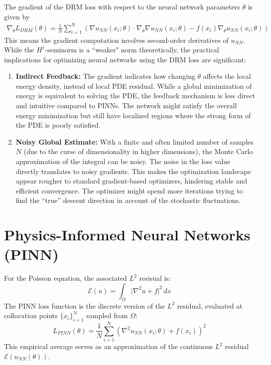 \documentclass{article}
\begin{document}
The gradient of the DRM loss with respect to the neural network parameters $\theta$ is given by
\begin{align*}
    \nabla_{\theta} L_{DRM}(\theta)
    = \frac{1}{N} \sum_{i=1}^N \left(\nabla u_{NN}(x_i; \theta) \cdot \nabla_{\theta} \nabla u_{NN}(x_i; \theta) - f(x_i) \nabla_{\theta} u_{NN}(x_i; \theta)\right)
\end{align*}
This means the gradient computation involves second-order derivatives of $u_{NN}$. 
While the $H^1$-seminorm is a ``weaker" norm theoretically, the practical implications for optimizing neural networks using the DRM loss are significant:
\begin{enumerate}
\item  \textbf{Indirect Feedback:} The gradient indicates how changing $\theta$ affects the local energy density, instead of local PDE residual. While a global minimization of energy is equivalent to solving the PDE, the feedback mechanism is less direct and intuitive compared to PINNs. The network might satisfy the overall energy minimization but still have localized regions where the strong form of the PDE is poorly satisfied.
\item  \textbf{Noisy Global Estimate:} With a finite and often limited number of samples $N$ (due to the curse of dimensionality in higher dimensions), the Monte Carlo approximation of the integral can be noisy. The noise in the loss value directly translates to noisy gradients. This makes the optimization landscape appear rougher to standard gradient-based optimizers, hindering stable and efficient convergence. The optimizer might spend more iterations trying to find the ``true'' descent direction in account of the stochastic fluctuations.
\end{enumerate}


\section{Physics-Informed Neural Networks (PINN)}

For the Poisson equation, the associated $L^2$ resisual is:
$$\mathcal{E}(u) = \int_{\Omega} \vert \nabla^2 u + f \vert^2 \, dx$$
The PINN loss function is the discrete version of the $L^2$ residual,  evaluated at collocation points $\{x_i\}_{i=1}^N$ sampled from $\Omega$:
$$L_{PINN}(\theta) = \frac{1}{N} \sum_{i=1}^{N} \left(\nabla^2 u_{NN}(x_i; \theta) + f(x_i) \right)^2$$
This empirical average serves as an approximation of the continuous $L^2$ residual $\mathcal{E}(u_{NN}(\theta))$. 
\end{document}
